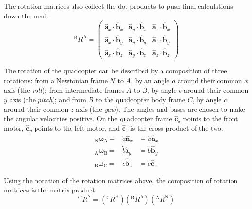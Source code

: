 \documentclass[lettersize,journal]{IEEEtran}
\begin{document}
The rotation matrices also collect the dot products to push final calculations down the road.
\begin{equation}
  {^\mathrm{B}R^\mathrm{A}} = 
  \begin{pmatrix}
    \mathbf{\hat{a}}_x \cdot \mathbf{\hat{b}}_x &
    \mathbf{\hat{a}}_y \cdot \mathbf{\hat{b}}_x &
    \mathbf{\hat{a}}_z \cdot \mathbf{\hat{b}}_x \\
    \mathbf{\hat{a}}_x \cdot \mathbf{\hat{b}}_y &
    \mathbf{\hat{a}}_y \cdot \mathbf{\hat{b}}_y &
    \mathbf{\hat{a}}_z \cdot \mathbf{\hat{b}}_y \\
    \mathbf{\hat{a}}_x \cdot \mathbf{\hat{b}}_z &
    \mathbf{\hat{a}}_y \cdot \mathbf{\hat{b}}_z &
    \mathbf{\hat{a}}_z \cdot \mathbf{\hat{b}}_z
  \end{pmatrix}
\end{equation}

The rotation of the quadcopter can be described by a composition of three rotations: from a Newtonian frame $N$ to $A$, by an angle $a$ around their common $x$ axis (the \emph{roll}); from intermediate frames $A$ to $B$, by angle $b$ around their common $y$ axis (the \emph{pitch}); and from $B$ to the quadcopter body frame $C$, by angle $c$ around their common $z$ axis (the \emph{yaw}). The angles and bases are chosen to make the angular velocities positive. On the quadcopter frame $\mathbf{\hat{c}}_x$ points to the front motor, $\mathbf{\hat{c}}_y$ points to the left motor, and $\mathbf{\hat{c}}_z$ is the cross product of the two.
\begin{eqnarray}
  {_\mathrm{N}\boldsymbol\omega_\mathrm{A}} =& \dot{a} \mathbf{\hat{n}}_x &= \dot{a} \mathbf{\hat{a}}_x \label{ARotVel}\\
  {_\mathrm{A}\boldsymbol\omega_\mathrm{B}} =& \dot{b} \mathbf{\hat{a}}_y &= \dot{b} \mathbf{\hat{b}}_y\\
  {_\mathrm{B}\boldsymbol\omega_\mathrm{C}} =& \dot{c} \mathbf{\hat{b}}_z &= \dot{c} \mathbf{\hat{c}}_z \label{CRotVel}
\end{eqnarray}

Using the notation of the rotation matrices above, the composition of rotation matrices is the matrix product.
\begin{equation}
  {^\mathrm{C}R^\mathrm{N}} = \left({^\mathrm{C}R^\mathrm{B}}\right)\left({^\mathrm{B}R^\mathrm{A}}\right)\left({^\mathrm{A}R^\mathrm{N}}\right)
\end{equation}
\end{document}
